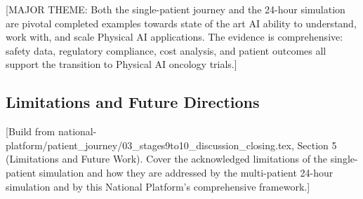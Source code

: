 [MAJOR THEME: Both the single-patient journey and the 24-hour simulation
are pivotal completed examples towards state of the art AI ability to
understand, work with, and scale Physical AI applications. The evidence
is comprehensive: safety data, regulatory compliance, cost analysis, and
patient outcomes all support the transition to Physical AI oncology trials.]

\subsection{Limitations and Future Directions}
\label{subsec:journey-limitations}

[Build from national-platform/patient\_journey/03\_stages9to10\_discussion\_closing.tex,
Section 5 (Limitations and Future Work). Cover the acknowledged limitations
of the single-patient simulation and how they are addressed by the multi-patient
24-hour simulation and by this National Platform's comprehensive framework.]
